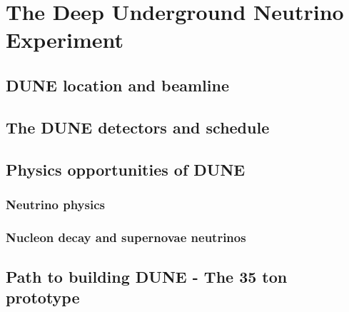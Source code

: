 
\chapter{The Deep Underground Neutrino Experiment}  %

\ifpdf
    \graphicspath{{DUNE/Figs/Raster/}{DUNE/Figs/PDF/}{DUNE/Figs/}}
\else
    \graphicspath{{DUNE/Figs/Vector/}{DUNE/Figs/}}
\fi

\section{DUNE location and beamline} %

\section{The DUNE detectors and schedule}  %

\section{Physics opportunities of DUNE} %

\subsection{Neutrino physics}  %

\subsection{Nucleon decay and supernovae neutrinos}  %

\section{Path to building DUNE - The 35 ton prototype}  %

